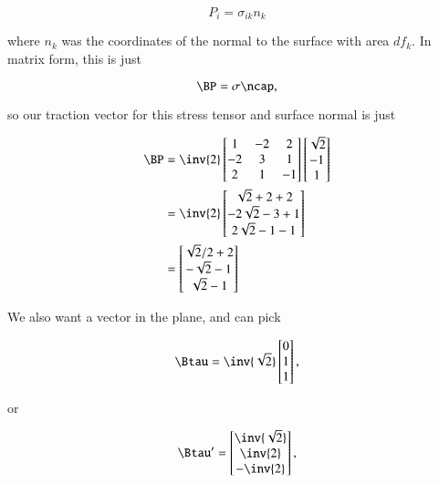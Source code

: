\begin{equation}\label{eqn:continuumProblemSet1:410}
P_i = \sigma_{ik} n_k
\end{equation}

where $n_k$ was the coordinates of the normal to the surface with area $df_k$.  In matrix form, this is just

\begin{equation}\label{eqn:continuumProblemSet1:430}
\BP = \sigma \ncap,
\end{equation}

so our traction vector for this stress tensor and surface normal is just

\begin{align*}
\BP &=
\inv{2}
\begin{bmatrix}
1 & -2 & 2 \\
-2 & 3 & 1 \\
2 & 1 & -1
\end{bmatrix}
\begin{bmatrix}
\sqrt{2} \\
-1 \\
1
\end{bmatrix} \\
&=
\inv{2}
\begin{bmatrix}
\sqrt{2} + 2 + 2 \\
-2\sqrt{2} - 3 + 1 \\
2\sqrt{2} - 1 -1
\end{bmatrix} \\
&=
\begin{bmatrix}
\sqrt{2}/2 + 2 \\
-\sqrt{2} -1 \\
\sqrt{2} - 1
\end{bmatrix}
\end{align*}

We also want a vector in the plane, and can pick

\begin{equation}\label{eqn:continuumProblemSet1:450}
\Btau = 
\inv{\sqrt{2}}
\begin{bmatrix}
0 \\
1 \\
1
\end{bmatrix},
\end{equation}

or

\begin{equation}\label{eqn:continuumProblemSet1:470}
\Btau' = 
\begin{bmatrix}
\inv{\sqrt{2}} \\
\inv{2} \\
-\inv{2}
\end{bmatrix},
\end{equation}

